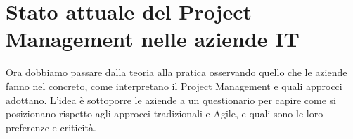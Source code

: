 \chapter{Stato attuale del Project Management nelle aziende IT}
\label{cap:aziende}

Ora dobbiamo passare dalla teoria alla pratica osservando quello che le aziende fanno nel concreto, come interpretano il Project Management e quali approcci adottano.
L'idea \`e sottoporre le aziende a un questionario per capire come si posizionano rispetto agli approcci tradizionali e Agile, e quali sono le loro preferenze e criticit\`a.



